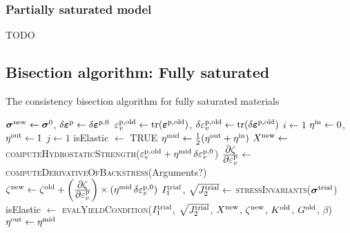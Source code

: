 \subsubsection{Partially saturated model}
{\Red TODO}

\subsection{Bisection algorithm: Fully saturated}
\begin{breakablealgorithm}
  \caption{The consistency bisection algorithm for fully saturated materials}
  \begin{algorithmic}[1]
      \State $\boldsymbol{\sigma}^{\text{new}} \leftarrow \boldsymbol{\sigma}^0$, $\delta\boldsymbol{\varepsilon}^{\text{p}} \leftarrow \delta\boldsymbol{\varepsilon}^{\text{p},0}$
      \State $\varepsilon^{\text{p},\text{old}}_v \leftarrow \text{tr}(\boldsymbol{\varepsilon}^{\text{p},\text{old}})$, 
             $\delta\varepsilon^{\text{p},\text{old}}_v \leftarrow \text{tr}(\delta\boldsymbol{\varepsilon}^{\text{p},\text{old}})$
      \State $i \leftarrow 1$
      \State $\eta^{\text{in}} \leftarrow 0$,  $\eta^{\text{out}} \leftarrow 1$ 
      \Repeat
        \State $j \leftarrow 1$
        \State isElastic $\leftarrow$ TRUE
          \State $\eta^{\text{mid}} \leftarrow \tfrac{1}{2}(\eta^{\text{out}} + \eta^{\text{in}})$
          \State $X^{\text{new}} \leftarrow$ \textsc{computeHydrostaticStrength}($\varepsilon^{\text{p},\text{old}}_v + 
                                          \eta^{\text{mid}} \,\delta\varepsilon^{\text{p},0}_v$)
          \State $\frac{\displaystyle\partial \zeta}{\displaystyle\partial \varepsilon^{\text{p}}_v} \leftarrow $
            \textsc{computeDerivativeOfBackstress}({\Red Arguments?})
          \State $\zeta^{\text{new}} \leftarrow \zeta^{\text{old}} + 
            \left(\frac{\displaystyle\partial \zeta}{\displaystyle\partial \varepsilon^{\text{p}}_v}\right)\times(\eta^{\text{mid}} \,\delta\varepsilon^{\text{p},0}_v)$
          \State $I_1^{\text{trial}}$, $\sqrt{J_2^{\text{trial}}} \leftarrow$ \textsc{stressInvariants}($\boldsymbol{\sigma}^{\text{trial}}$)
          \State isElastic $\leftarrow$ \textsc{evalYieldCondition}($I_1^{\text{trial}}$, $\sqrt{J_2^{\text{trial}}}$, $X^{\text{new}}$, 
                                                                    $\zeta^{\text{new}}$, $K^{\text{old}}$, $G^{\text{old}}$,
                                                                    $\beta$)
          \State $\eta^{\text{out}} \leftarrow \eta^{\text{mid}}$ 

\end{algorithmic}
\end{breakablealgorithm}
